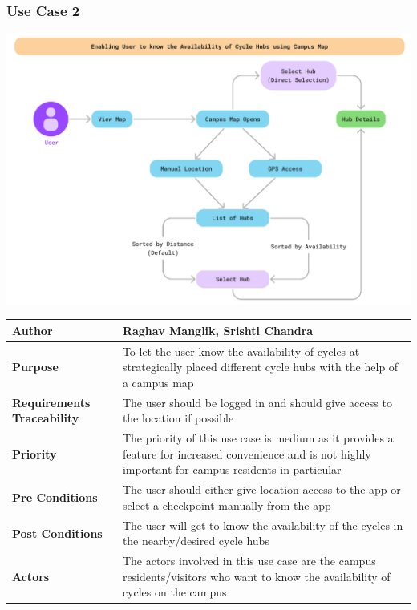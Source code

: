 \documentclass[11pt]{article}
\begin{document}
\subsubsection{Use Case 2}
\begin{center}
\includegraphics*[scale=0.5]{usecase-2.png}
\begin{tabular}{|l|p{10cm}|}
    \hline
    \textbf{Author} & Raghav Manglik, Srishti Chandra \\
    \hline
    \textbf{Purpose} & To let the user know the availability of cycles at strategically placed different cycle hubs with the help of a campus map \\
    \hline
    \textbf{Requirements Traceability} & The user should be logged in and should give access to  the location if possible\\
    \hline
    \textbf{Priority} & The priority of this use case is medium as it provides a feature for increased convenience and is not highly important for campus residents in particular\\
    \hline
    \textbf{Pre Conditions} &The user should either give location access to the app or select a checkpoint manually from the app \\
    \hline
    \textbf{Post Conditions} & The user will get to know the availability of the cycles in the   nearby/desired cycle hubs\\
    \hline
    \textbf{Actors} & The actors involved in this use case are the campus residents/visitors who want to know the availability of cycles on the campus\\
    \hline
\end{tabular}
\end{center}
\end{document}
